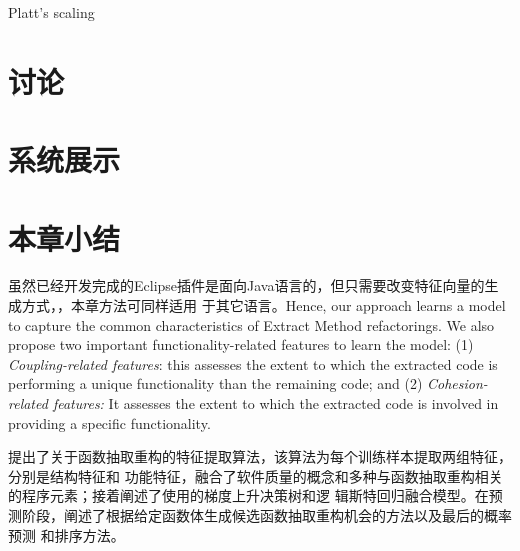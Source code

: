 Platt's scaling
\section{讨论}\label{discuss}
\section{系统展示}
\section{本章小结}
虽然已经开发完成的Eclipse插件是面向Java语言的，但只需要改变特征向量的生成方式，，本章方法可同样适用
于其它语言。Hence, our approach learns a model to capture the common characteristics of Extract
Method refactorings. We also propose two important functionality-related features to learn the
model: (1) {\em Coupling-related features}: this assesses the extent to which the extracted code is
performing a unique functionality than the remaining code; and (2) {\em Cohesion-related features:}
It assesses the extent to which the extracted code is involved in providing a specific
functionality.

提出了关于函数抽取重构的特征提取算法，该算法为每个训练样本提取两组特征，分别是结构特征和
功能特征，融合了软件质量的概念和多种与函数抽取重构相关的程序元素；接着阐述了使用的梯度上升决策树和逻
辑斯特回归融合模型。在预测阶段，阐述了根据给定函数体生成候选函数抽取重构机会的方法以及最后的概率预测
和排序方法。